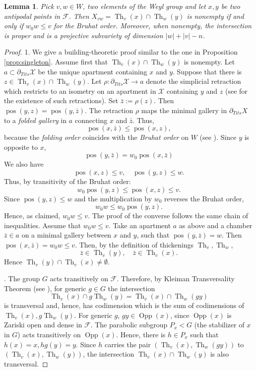 \documentclass[12pt]{amsbook}%
\newtheorem{lem}[thm]{Lemma}
\theoremstyle{definition}
\theoremstyle{remark}
\numberwithin{section}{chapter}
\numberwithin{subsection}{section}
\numberwithin{figure}{chapter}
\DeclareMathOperator{\Th}{Th}
\DeclareMathOperator{\Opp}{Opp}
\def\tits{\partial_{Tits}}
\def\cF{{\mathscr{F}}}
\def\cX{{\mathscr{X}}}
\begin{document}
{{\begin{lem}  \label{lem:intersection of opposite thickenings} 
Pick $v, w \in W $, two elements of the Weyl group and let $x, y$ be two antipodal points in $\cF$. 
 Then $X_{vw}= \Th_v(x) \cap \Th_w(y)$ is nonempty if and only if $ w_0 w \le v$ for the Bruhat order. 
 Moreover, when nonempty, the intersection is proper and is  a projective  subvariety of dimension $|w| + |v| - n$.  
\end{lem} 
\begin{proof}  

1. We give a building-theoretic proof similar to the one in Proposition \ref{prop:singleton}. 
Assume first that $ \Th_v(x) \cap \Th_w(y)$ is nonempty. 
Let $a\subset \tits \cX$ be the unique apartment containing $x$ and $y$. Suppose that 
there is $z\in \Th_v(x) \cap \Th_w(y)$. Let $\rho: \tits \cX\to a$ denote the simplicial retraction which restricts to an isometry on an apartment 
in $\cX$ containing $y$ and $z$ (see \cite{Ronan} for the existence of such retractions). 
Set $\bar{z}:= \rho(z)$. Then $\operatorname{pos}(y, z)= \operatorname{pos}(y, \bar z)$. The retraction $\rho$ maps the minimal gallery in $\tits X$ to 
a {\em folded gallery} in $a$ connecting $x$ and $\bar z$. Thus, 
$$
\operatorname{pos}(x, \bar z)\le \operatorname{pos}(x,z),
$$
because the {\em folding order} coincides with the {\em Bruhat order} on $W$ (see \cite{KLP18A}). Since $y$ is opposite to $x$, 
$$
\operatorname{pos}(y, \bar z)= w_0 \operatorname{pos}(x, \bar z)$$
We also have 
$$
 \operatorname{pos}(x,z)\le v, \quad \operatorname{pos}(y,z)\le w.
$$
Thus, by transitivity of the Bruhat order:
$$
w_0 \operatorname{pos}(y,z)\le \operatorname{pos}(x,z) \le v.
$$
Since $\operatorname{pos}(y,z)\le w$ and the multiplication by $w_0$ reverses the Bruhat order,
$$
w_0 w\le w_0 \operatorname{pos}(y,z). 
$$
Hence, as claimed, $ w_0 w \le v$.  The proof of the converse follows the same chain of inequalities. 
Assume that $ w_0 w \le v$. Take an apartment $a$ as above and a chamber $\bar{z}\in a$ on a minimal gallery between $x$ and $y$, 
such that $\operatorname{pos}(y,\bar z)=w$. Then $\operatorname{pos}(x, \bar z)=w_0w\le v$. Then, by the definition of thickenings $\Th_v, \Th_w$,
$$
\bar z\in \Th_v(y), \quad \bar z\in \Th_v(x).
$$ 
Hence $\Th_v(y)\cap \Th_v(x)\ne \emptyset$. 

. The group $G$ acts transitively on $\cF$. Therefore, by Kleiman Transversality Theorem (see \cite{Kleiman74}), for generic $g\in G$ the intersection 
$$
\Th_v(x) \cap g \Th_w(y) = \Th_v(x) \cap \Th_w(gy)$$
is transversal and, hence, has codimension which is the sum of codimensions of $\Th_v(x), g \Th_w(y)$. 
For generic $g$, $gy\in \Opp(x)$, since $\Opp(x)$ is Zariski open and dense in $\cF$. The parabolic subgroup $P_x< G$ (the stabilizer of $x$ in $G$) 
acts transitively on $\Opp(x)$. Hence, there is $h\in P_x$ such that $h(x)=x, hg(y)=y$. Since $h$ carries the pair $(\Th_v(x), \Th_w(gy))$ to 
$(\Th_v(x), \Th_w(y))$, the intersection $\Th_v(x) \cap \Th_w(y)$ is also transversal. 
\end{proof}


}}
\end{document}
